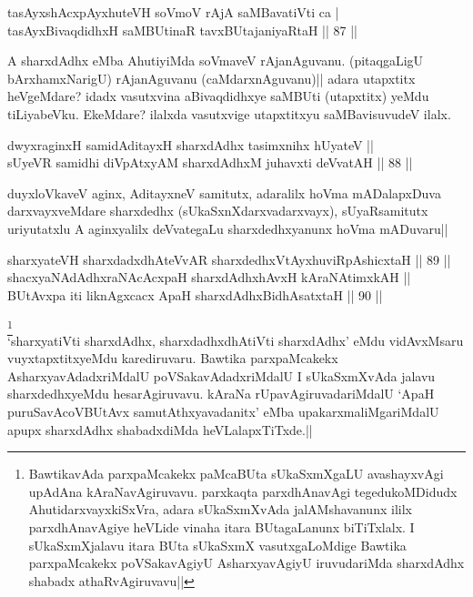 
\begin{shl}
tasAyxshAcxpAyxhuteVH soVmoV rAjA saMBavatiVti ca | \\
tasAyxBivaqdidhxH saMBUtinaR tavxBUtajaniyaRtaH \hfill|| 87 || 
\end{shl}

\begin{artha}
A sharxdAdhx eMba AhutiyiMda soVmaveV rAjanAguvanu. (pitaqgaLigU 
bArxhamxNarigU) rAjanAguvanu (caMdarxnAguvanu)|| adara utapxtitx 
heVgeMdare? idadx vasutxvina aBivaqdidhxye saMBUti (utapxtitx) yeMdu 
tiLiyabeVku. EkeMdare? ilalxda vasutxvige utapxtitxyu saMBavisuvudeV 
ilalx.
\end{artha}


\begin{shl}
dwyxraginxH samidAditayxH sharxdAdhx tasimxnihx hUyateV || \\
sUyeVR samidhi diVpAtxyAM sharxdAdhxM juhavxti deVvatAH \hfill|| 88 || 
\end{shl}

\begin{artha}
duyxloVkaveV aginx, AditayxneV samitutx, adaralilx hoVma mADalapxDuva 
darxvayxveMdare sharxdedhx (sUkaSxnXdarxvadarxvayx), sUyaRsamitutx 
uriyutatxlu A aginxyalilx deVvategaLu sharxdedhxyanunx hoVma mADuvaru||
\end{artha}


\begin{shl}
sharxyateVH sharxdadxdhAteVvAR sharxdedhxVtAyxhuviRpAshicxtaH \hfill|| 89 || \\
shacxyaNAdAdhxraNAcAcx\s \s paH sharxdAdhxhAvxH kAraNAtimxkAH || \\
BUtAvx\s \s pa iti liknAgxcacx ApaH sharxdAdhxBidhAsatxtaH \hfill|| 90 || 
\end{shl}

\begin{artha}
\footnote[1]{BawtikavAda parxpaMcakekx paMcaBUta sUkaSxmXgaLU 
avashayxvAgi upAdAna kAraNavAgiruvavu. parxkaqta parxdhAnavAgi 
tegedukoMDidudx AhutidarxvayxkiSxVra, adara sUkaSxmXvAda 
jalAMshavanunx ililx parxdhAnavAgiye heVLide vinaha itara BUtagaLanunx 
biTiTxlalx. I sUkaSxmXjalavu itara BUta sUkaSxmX vasutxgaLoMdige 
Bawtika parxpaMcakekx poVSakavAgiyU AsharxyavAgiyU iruvudariMda 
sharxdAdhx shabadx athaRvAgiruvavu||}\\
`sharxyatiVti sharxdAdhx, sharxdadhxdhAtiVti sharxdAdhx' eMdu 
vidAvxMsaru vuyxtapxtitxyeMdu karediruvaru. Bawtika parxpaMcakekx 
AsharxyavAdadxriMdalU poVSakavAdadxriMdalU I sUkaSxmXvAda jalavu 
sharxdedhxyeMdu hesarAgiruvavu. kAraNa rUpavAgiruvadariMdalU `ApaH 
puruSavAcoVBUtAvx samutAthxyavadanitx' eMba upakarxmaliMgariMdalU 
apupx sharxdAdhx shabadxdiMda heVLalapxTiTxde.|| 
\end{artha}

